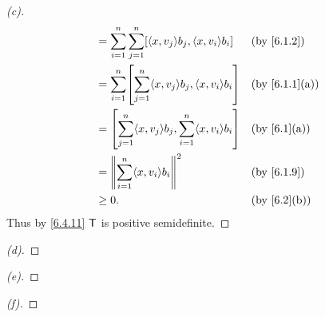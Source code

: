 \begin{proof}[(c)]
\begin{align*}
     & = \sum_{i = 1}^n \sum_{j = 1}^n [\inn{x, v_j} b_j, \inn{x, v_i} b_i]                                   &  & \text{(by \cref{6.1.2})}       \\
     & = \sum_{i = 1}^n \br{\sum_{j = 1}^n \inn{x, v_j} b_j, \inn{x, v_i} b_i}                                &  & \text{(by \cref{6.1.1}(a))}    \\
     & = \br{\sum_{j = 1}^n \inn{x, v_j} b_j, \sum_{i = 1}^n \inn{x, v_i} b_i}                                &  & \text{(by \cref{6.1}(a))}      \\
     & = \norm{\sum_{i = 1}^n \inn{x, v_i} b_i}^2                                                             &  & \text{(by \cref{6.1.9})}       \\
     & \geq 0.                                                                                                &  & \text{(by \cref{6.2}(b))}
  \end{align*}
  Thus by \cref{6.4.11} \(\mathsf{T}\) is positive semidefinite.
\end{proof}

\begin{proof}[(d)]

\end{proof}

\begin{proof}[(e)]

\end{proof}

\begin{proof}[(f)]

\end{proof}
